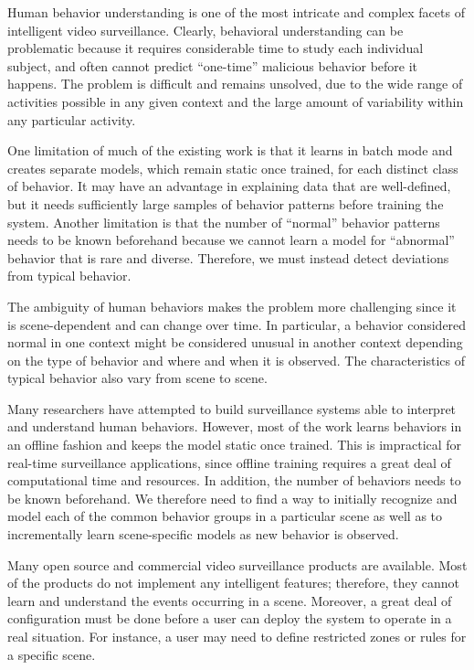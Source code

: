 Human behavior understanding is one of the most intricate and complex facets of
intelligent video surveillance. 
Clearly, behavioral understanding can be problematic because it requires 
considerable time to study each individual subject, and often cannot 
predict ``one-time'' malicious behavior before it happens.
The problem is difficult and
remains unsolved, due to the wide range of activities possible in any
given context and the large amount of variability within any
particular activity.

One limitation of much of the existing work is that it learns in batch
mode and creates separate models, which remain static once trained,
for each distinct class of behavior. It may have an advantage in
explaining data that are well-defined, but it needs sufficiently large
samples of behavior patterns before training the system. Another
limitation is that the number of ``normal'' behavior patterns needs to
be known beforehand because we cannot learn a model for ``abnormal''
behavior that is rare and diverse. Therefore, we must instead detect
deviations from typical behavior.

The ambiguity of human behaviors makes the problem more challenging
since it is scene-dependent and can change over time. In particular, a
behavior considered normal in one context might be considered unusual
in another context depending on the type of behavior and where and
when it is observed. The characteristics of typical behavior also vary
from scene to scene.

Many researchers have attempted to build surveillance systems able to
interpret and understand human behaviors. However, most of the work
learns behaviors in an offline fashion and keeps the model static once
trained. This is impractical for real-time surveillance applications,
since offline training requires a great deal of computational time and
resources. In addition, the number of behaviors needs to be known
beforehand. We therefore need to find a way to initially recognize and
model each of the common behavior groups in a particular scene as well
as to incrementally learn scene-specific models as new behavior is
observed.

Many open source and commercial video surveillance products are 
available. Most of the products do not implement any intelligent
features; therefore, they cannot learn and understand the events
occurring in a scene. Moreover, a great deal of configuration must be done
before a user can deploy the system to operate in a real situation.
For instance, a user may need to define restricted zones or rules
for a specific scene.

